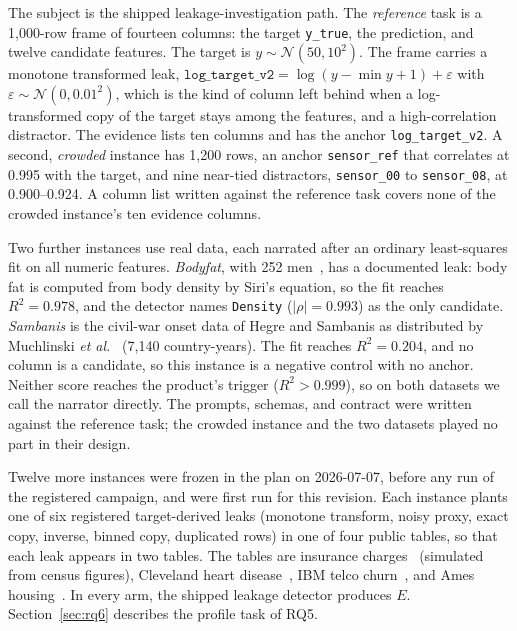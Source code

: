 \documentclass[journal]{IEEEtran}
\begin{document}
The subject is the shipped leakage-investigation path. The \emph{reference}
task is a 1,000-row frame of fourteen columns: the target \texttt{y\_true},
the prediction, and twelve candidate features. The target is
$y\sim\mathcal{N}(50,10^2)$. The frame carries a monotone transformed leak,
$\texttt{log\_target\_v2}=\log(y-\min y+1)+\varepsilon$ with
$\varepsilon\sim\mathcal{N}(0,0.01^2)$, which is the kind of column left behind
when a log-transformed copy of the target stays among the features, and a
high-correlation distractor. The evidence lists ten columns and has the
anchor \texttt{log\_target\_v2}. A second, \emph{crowded} instance has 1,200
rows, an anchor \texttt{sensor\_ref} that correlates at 0.995 with the target,
and nine near-tied distractors, \texttt{sensor\_00} to \texttt{sensor\_08}, at
0.900--0.924. A column list written against the reference task covers none of
the crowded instance's ten evidence columns.

Two further instances use real data, each narrated after an ordinary
least-squares fit on all numeric features. \emph{Bodyfat}, with 252
men~\cite{penrose1985bodyfat}, has a documented leak: body fat is computed from
body density by Siri's equation, so the fit reaches $R^2=0.978$, and the
detector names \texttt{Density} ($|\rho|=0.993$) as the only candidate.
\emph{Sambanis} is the civil-war onset data of Hegre and Sambanis as
distributed by Muchlinski \emph{et al.}~\cite{muchlinski2016civilwar} (7{,}140
country-years). The fit reaches $R^2=0.204$, and no column is a candidate, so
this instance is a negative control with no anchor. Neither score reaches the
product's trigger ($R^2>0.999$), so on both datasets we call the narrator
directly. The prompts, schemas, and contract were written against the
reference task; the crowded instance and the two datasets played no part in
their design.

Twelve more instances were frozen in the plan on 2026-07-07, before any run
of the registered campaign, and were first run for this revision. Each instance plants one of six
registered target-derived leaks (monotone transform, noisy proxy, exact copy,
inverse, binned copy, duplicated rows) in one of four public tables, so that
each leak appears in two tables. The tables are insurance
charges~\cite{lantz2013mlr} (simulated from census figures), Cleveland heart
disease~\cite{janosi1988heart}, IBM telco churn~\cite{ibm2019telco}, and Ames
housing~\cite{decock2011ames}. In every arm, the shipped leakage detector
produces $E$. Section~\ref{sec:rq6} describes the profile task of RQ5.
\end{document}
